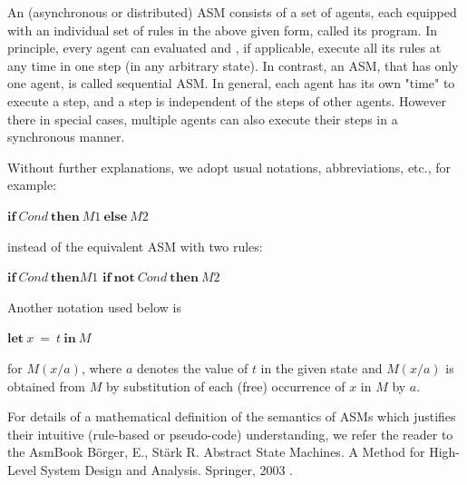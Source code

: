 An (asynchronous or distributed) ASM consists of a set of agents, each equipped with an individual set of rules in the above given form, called its program. In principle, every agent can evaluated and , if applicable, execute all its rules at any time in one step (in any arbitrary state). In contrast, an ASM, that has only one agent, is called sequential ASM. In general, each agent has its own "time" to execute a step, and a step is independent of the steps of other agents. However there in special cases, multiple agents can also execute their steps in a synchronous manner.

Without further explanations, we adopt usual notations, abbreviations, etc., for example:

\medskip
$ \mathbf{if} ~ Cond  ~ \mathbf{then} ~ M1 ~ \mathbf{else} ~ M2$
\medskip

instead of the equivalent ASM with two rules:

\medskip
$ \mathbf{if} ~ Cond  ~ \mathbf{then}  M1$
$ \mathbf{if ~ not} ~ Cond  ~ \mathbf{then} ~ M2$
\medskip

Another notation used below is

\medskip
$ \mathbf{let} ~ x ~ = ~ t ~ \mathbf{in} ~ M$
\medskip

for $M(x/a)$, where $a$ denotes the value of $t$ in the given state and $M(x/a)$ is obtained from $M$ by substitution of each (free) occurrence of $x$ in $M$ by $a$.

For details of a mathematical definition of the semantics of ASMs which justifies their intuitive (rule-based or pseudo-code) understanding, we refer the reader to the AsmBook Börger, E., Stärk R. Abstract State Machines. A Method for High-Level System Design and Analysis. Springer, 2003 \cite{book:ASM-2003}.





